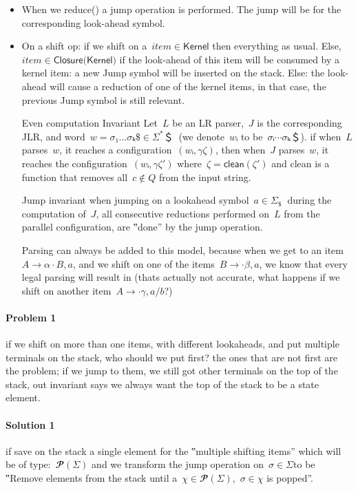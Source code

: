 \begin{itemize}
  \item When we \textsf{reduce()} a jump operation is performed.
    The jump will be for the corresponding look-ahead symbol.
  \item On a shift op:
  if we shift on a~$item∈\textsf{Kernel}$
    then everything as usual.
  Else,~$item∈\textsf{Closure(Kernel)}$
      if the look-ahead of this item will be consumed by a kernel item:
        a new Jump symbol will be inserted on the stack.
      Else:
        the look-ahead will cause a reduction of one of the kernel items,
        in that case, the previous Jump symbol is still relevant.
  \item[Even computation Invariant]
    Let~$L$ be an LR parser,~$J$ is the corresponding JLR, and word~$w =σ₁…σₖ \$∈Σ^*＄~$ (we denote~$wᵢ$ to be~$σᵢ⋯σₖ ＄$).
    if when~$L$ parses~$w$, it reaches a configuration~$(wᵢ,γζ)$,
    then when~$J$ parses~$w$, it reaches the configuration~$(wᵢ,γζ')$ where~$ζ= \textsf{clean}(ζ')$
    and \textsf{clean} is a function that removes all~$c∉Q$ from the input string.
  \item[Jump invariant]
    when jumping on a lookahead symbol~$a∈Σ_\$~$ during the computation of~$J$,
    all consecutive reductions performed on~$L$ from the parallel configuration, are ‟done” by the \textsf{jump} operation.
  \item[Parsing] can always be added to this model, because when we get to an item~$A→α·B,a$, and we shift on
    one of the items~$B→·β,a$, we know that every legal parsing will result in (thats actually not accurate, what happens
    if we shift on another item~$A→·γ,a/b$?)
\end{itemize}
\paragraph{Problem 1} if we shift on more than one items, with different lookaheads,
  and put multiple terminals on the stack, who should we put first? the ones that are
  not first are the problem; if we jump to them, we still got other terminals on the
  top of the stack, out invariant says we always want the top of the stack to be a
  state element.

\paragraph{Solution 1} if save on the stack a single element for the
  ‟multiple shifting items” which will be of type:~$𝓟(Σ)$
  and we transform the jump operation on~$σ∈Σ$to be ‟Remove elements
  from the stack until a~$χ∈𝓟(Σ)$,~$σ∈χ$ is popped”.

